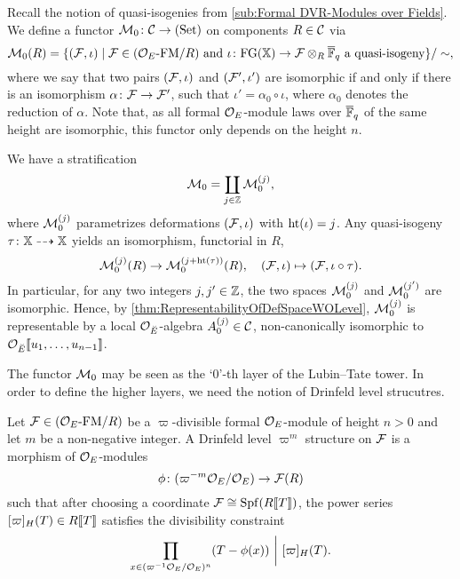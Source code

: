 \documentclass[../main.tex]{subfiles}
\begin{document}
Recall the notion of quasi-isogenies from \cref{sub:Formal DVR-Modules over Fields}.
We define a functor $\mathcal{M}_0\colon \mathcal{C} \to {(\mathrm{Set})}$ on components $R \in \mathcal{C}$ via
\begin{equation*}
  \mathcal{M}_0(R) = \{(\mathcal{F}, \iota) \mid \mathcal{F} \in {({\mathcal{O}_E}\textnormal-\allowbreak\mathrm{FM}/{R})} \text { and }
  \iota\colon \textnormal{FG}(\mathbb{X}) \to \mathcal{F} \otimes_R {\overline {\mathbb{F}}_q} \text{ a quasi-isogeny}\}/\sim,
\end{equation*}
where we say that two pairs $(\mathcal{F}, \iota)$ and $(\mathcal{F}', \iota')$ are isomorphic
if and only if there is an isomorphism $\alpha \colon \mathcal{F} \to \mathcal{F}'$,
such that $\iota' = \alpha_0 \circ \iota$, where $\alpha_0$ denotes the reduction
of $\alpha$. Note that, as all formal $\mathcal{O}_E$-module laws over ${\overline {\mathbb{F}}_q}$ of the same height
are isomorphic, this functor only depends on the height $n$.

We have a stratification
\begin{equation*}
  \mathcal{M}_0 = \coprod_{j \in \mathbb{Z}} \mathcal{M}_0^{(j)},
\end{equation*}
where $\mathcal{M}_0^{(j)}$ parametrizes deformations $(\mathcal{F}, \iota)$ with $\textnormal{ht}(\iota) = j$.
Any quasi-isogeny $\tau\colon \mathbb{X} \dashrightarrow \mathbb{X}$ yields an isomorphism, 
functorial in $R$,
\begin{equation*}
  \mathcal{M}_0^{(j)}(R) \to \mathcal{M}_0^{(j + \textnormal{ht}(\tau))}(R), \quad
  (\mathcal{F}, \iota) \mapsto (\mathcal{F}, \iota \circ \tau). 
\end{equation*}
In particular, for any two integers $j, j' \in \mathbb{Z}$, the two spaces
$\mathcal{M}_0^{(j)}$ and $\mathcal{M}_0^{(j')}$ are isomorphic. Hence, by
\cref{thm:RepresentabilityOfDefSpaceWOLevel}, $\mathcal{M}_0^{(j)}$ is representable by 
a local $\mathcal{O}_{\breve {E}}$-algebra $A^{(j)}_0 \in \mathcal{C}$, non-canonically isomorphic 
to $\mathcal{O}_{\breve {E}} \llbracket u_1, \dots, u_{n-1} \rrbracket$.

The functor $\mathcal{M}_0$ may be seen as the ‘$0$’-th layer of the Lubin--Tate tower. 
In order to define the higher layers, we need the notion of Drinfeld level strucutres.

\begin{defi}
  Let $\mathcal{F} \in {({\mathcal{O}_E}\textnormal-\allowbreak\mathrm{FM}/{R})}$ be a $\varpi$-divisible formal $\mathcal{O}_E$-module
  of height $n>0$ and let $m$ be a non-negative 
  integer. A Drinfeld level  $\varpi^m$ structure on $\mathcal{F}$ is a morphism of
  $\mathcal{O}_E$-modules 
  \begin{equation*}
    \phi\colon {(\varpi^{-m}\mathcal{O}_E/\mathcal{O}_E)} \to \mathcal{F}(R)
  \end{equation*}
  such that after choosing a coordinate $\mathcal{F} \cong \operatorname{Spf}(R\llbracket T \rrbracket)$, the 
  power series $[\varpi]_H(T) \in R\llbracket T \rrbracket$ satisfies the divisibility
  constraint
  \begin{equation*}
    \prod_{x \in (\varpi^{-1}\mathcal{O}_E/\mathcal{O}_E)^n}(T - \phi(x)) \ \bigg\vert \ [\varpi]_H(T).
  \end{equation*}
\end{defi}
\end{document}
